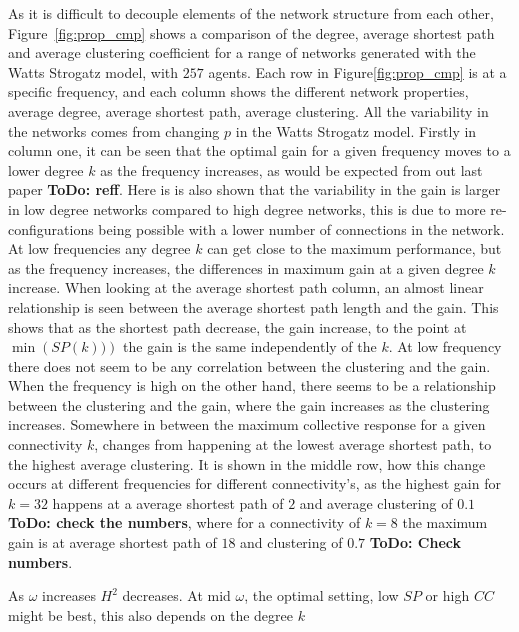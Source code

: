 \documentclass[fleqn,10pt]{wlscirep}
\newcommand{\TODO}[1]{{\bf {\color{red} ToDo:} #1}}
\begin{document}
As it is difficult to decouple elements of the network structure from each other, Figure~\ref{fig:prop_cmp} shows a comparison of the degree, average shortest path and average clustering coefficient for a range of networks generated with the Watts Strogatz model, with $257$ agents. Each row in Figure\ref{fig:prop_cmp} is at a specific frequency, and each column shows the different network properties, average degree, average shortest path, average clustering. All the variability in the networks comes from changing $p$ in the Watts Strogatz model. Firstly in column one, it can be seen that the optimal gain for a given frequency moves to a lower degree $k$ as the frequency increases, as would be expected from out last paper \TODO{reff}. Here is is also shown that the variability in the gain is larger in low degree networks compared to high degree networks, this is due to more re-configurations being possible with a lower number of connections in the network. At low frequencies any degree $k$ can get close to the maximum performance, but as the frequency increases, the differences in maximum gain at a given degree $k$ increase. When looking at the average shortest path column, an almost linear relationship is seen between the average shortest path length and the gain. This shows that as the shortest path decrease, the gain increase, to the point at $\min({SP(k))})$ the gain is the same independently of the $k$. At low frequency there does not seem to be any correlation between the clustering and the gain.
When the frequency is high on the other hand, there seems to be a relationship between the clustering and the gain, where the gain increases as the clustering increases. Somewhere in between the maximum collective response for a given connectivity $k$, changes from happening at the lowest average shortest path, to the highest average clustering. It is shown in the middle row, how this change occurs at different frequencies for different connectivity's, as the highest gain for $k=32$ happens at a average shortest path of $2$ and average clustering of $0.1$ \TODO{check the numbers}, where for a connectivity of $k=8$ the maximum gain is at average shortest path of $18$ and clustering of $0.7$ \TODO{Check numbers}.



As $\omega$ increases $H^2$ decreases.
At mid $\omega$, the optimal setting, low $SP$ or high $CC$ might be best, this also depends on the degree $k$
\end{document}
